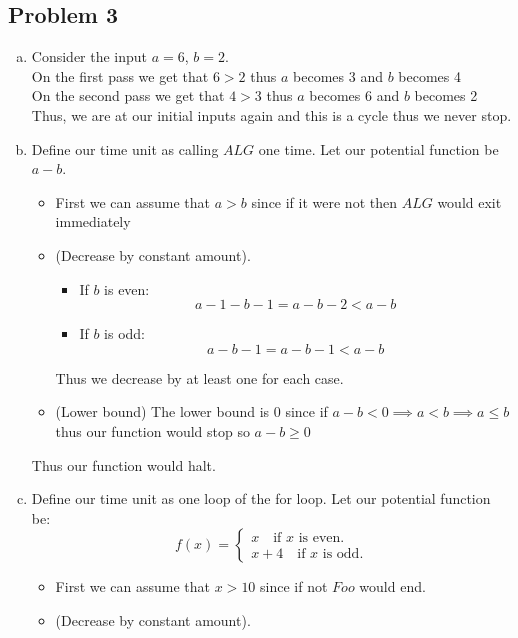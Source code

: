 \documentclass[12pt, letterpaper]{article}
\theoremstyle{definition}
\renewcommand{\t}[1]{\text{#1}}
\begin{document}
\newpage
\subsection*{Problem 3}
\begin{enumerate}[(a)]
    \item Consider the input $a=6$, $b=2$.\\
    On the first pass we get that $6>2$ thus $a$ becomes 3 and $b$ becomes 4\\
    On the second pass we get that $4>3$ thus $a$ becomes 6 and $b$ becomes 2\\
    Thus, we are at our initial inputs again and this is a cycle thus we never stop.
    \item Define our time unit as calling $ALG$ one time. Let our potential function be $a-b$.\\
    \begin{itemize}
        \item First we can assume that $a > b$ since if it were not then $ALG$ would exit immediately
        \item (Decrease by constant amount).\\
        \begin{itemize}
            \item If $b$ is even: \[a-1-b-1=a-b-2 < a-b\]
            \item If $b$ is odd: \[a-b-1=a-b-1 < a-b\]
        \end{itemize}
        Thus we decrease by at least one for each case.
        \item (Lower bound) The lower bound is $0$ since if $a-b < 0 \implies a < b \implies a \leq b$ thus our function would stop so $a-b \geq 0$
    \end{itemize}
    Thus our function would halt.
    \item Define our time unit as one loop of the for loop. Let our potential function be:
    \begin{equation*}
        f(x)=\begin{cases}
            x \quad \t{if } x \t{ is even.}\\
            x+4 \quad \t{if } x \t{ is odd.}
        \end{cases}
    \end{equation*}
    \begin{itemize}
        \item First we can assume that $x>10$ since if not $Foo$ would end.
        \item (Decrease by constant amount).

\end{itemize}
\end{enumerate}
\end{document}

